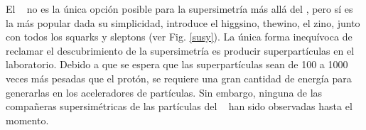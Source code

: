 El \MSSM ~ no es la única opción posible para la supersimetría más allá del \ME, %
pero sí es la más popular dada su simplicidad, introduce el higgsino, thewino, el zino, junto con todos los squarks y sleptons (ver Fig. \ref{susy}). 
La única forma inequívoca de reclamar el descubrimiento de la supersimetría es producir superpartículas en el laboratorio. Debido a que se espera que las superpartículas sean de 100 a 1000 veces más pesadas que el protón, se requiere una gran cantidad de energía para generarlas %
en los aceleradores de partículas. Sin embargo, ninguna de las compañeras supersimétricas de las partículas del \ME ~ han sido observadas hasta el momento.


